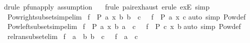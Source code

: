 \begin{isabellebody}
%
\isadelimproof
%
\endisadelimproof
%
\isatagproof
{}\isamarkupfalse%
{\isacharparenleft}drule\ pfun{\isacharunderscore}apply{\isacharcomma}\ assumption{\isacharparenright}\isanewline
{}\isamarkupfalse%
\ \ \ {\isacharparenleft}frule\ pair{\isacharunderscore}exhaust{\isacharcomma}\ {\isacharparenleft}erule\ exE{\isacharparenright}{\isacharplus}{\isacharcomma}\ simp{\isacharparenright}%
\endisatagproof
{\isafoldproof}%
%
\isadelimproof
\isanewline
%
\endisadelimproof
\isanewline
\isanewline
{}\isamarkupfalse%
\ Pow{\isacharunderscore}right{\isacharunderscore}subset{\isacharbrackleft}simp{\isacharcomma}elim{\isacharbang}{\isacharbrackright}{\isacharcolon}\isanewline
{\isachardoublequoteopen}{\isacharbrackleft}{\isacharbar}\ f\ {\isacharcolon}\ {\isacharpercent}P\ {\isacharparenleft}a\ {\isacharpercent}x\ b{\isacharparenright}{\isacharsemicolon}\ b\ {\isacharless}{\isacharequal}\ c\ {\isacharbar}{\isacharbrackright}\ {\isacharequal}{\isacharequal}{\isachargreater}\ f\ {\isacharcolon}\ {\isacharpercent}P\ {\isacharparenleft}a\ {\isacharpercent}x\ c{\isacharparenright}{\isachardoublequoteclose}\isanewline
%
\isadelimproof
%
\endisadelimproof
%
\isatagproof
{}\isamarkupfalse%
{\isacharparenleft}auto\ simp{\isacharcolon}\ Pow{\isacharunderscore}def{\isacharparenright}%
\endisatagproof
{\isafoldproof}%
%
\isadelimproof
\isanewline
%
\endisadelimproof
\isanewline
\isanewline
{}\isamarkupfalse%
\ Pow{\isacharunderscore}left{\isacharunderscore}subset{\isacharbrackleft}simp{\isacharcomma}elim{\isacharbang}{\isacharbrackright}{\isacharcolon}\isanewline
{\isachardoublequoteopen}{\isacharbrackleft}{\isacharbar}\ f\ {\isacharcolon}\ {\isacharpercent}P\ {\isacharparenleft}a\ {\isacharpercent}x\ b{\isacharparenright}{\isacharsemicolon}\ a\ {\isacharless}{\isacharequal}\ c\ {\isacharbar}{\isacharbrackright}\ {\isacharequal}{\isacharequal}{\isachargreater}\ f\ {\isacharcolon}\ {\isacharpercent}P\ {\isacharparenleft}c\ {\isacharpercent}x\ b{\isacharparenright}{\isachardoublequoteclose}\isanewline
%
\isadelimproof
%
\endisadelimproof
%
\isatagproof
{}\isamarkupfalse%
{\isacharparenleft}auto\ simp{\isacharcolon}\ Pow{\isacharunderscore}def{\isacharparenright}%
\endisatagproof
{\isafoldproof}%
%
\isadelimproof
\isanewline
%
\endisadelimproof
\isanewline
\isanewline
{}\isamarkupfalse%
\ rel{\isacharunderscore}ran{\isacharunderscore}subset{\isacharbrackleft}elim{\isacharbang}{\isacharbrackright}{\isacharcolon}\isanewline
{\isachardoublequoteopen}{\isacharbrackleft}{\isacharbar}\ f\ {\isacharcolon}\ a\ {\isacharless}{\isacharminus}{\isacharminus}{\isachargreater}\ b{\isacharsemicolon}\ b\ {\isacharless}{\isacharequal}\ c\ {\isacharbar}{\isacharbrackright}\ {\isacharequal}{\isacharequal}{\isachargreater}\ f\ {\isacharcolon}\ a\ {\isacharless}{\isacharminus}{\isacharminus}{\isachargreater}\ c{\isachardoublequoteclose}\isanewline

\end{isabellebody}
